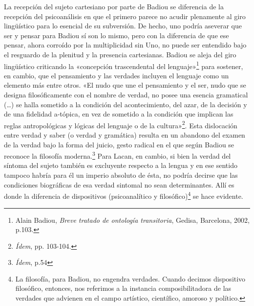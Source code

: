 La recepción del sujeto cartesiano por parte de Badiou se diferencia de la recepción del psicoanálisis en que el primero parece no acudir plenamente al giro lingüístico para lo esencial de su subversión. De hecho, uno podría aseverar que ser y pensar para Badiou sí son lo mismo, pero con la diferencia de que ese pensar, ahora corroído por la multiplicidad sin Uno, no puede ser entendido bajo el resguardo de la plenitud y la presencia cartesianas. Badiou se aleja del giro lingüístico criticando la «concepción trascendental del lenguaje»\footnote{Alain Badiou, \emph{Breve tratado de ontología transitoria}, Gedisa, Barcelona, 2002, p.103.} para sostener, en cambio, que el pensamiento y las verdades incluyen el lenguaje como un elemento más entre otros. «El nudo que une el pensamiento y el ser, nudo que se designa filosóficamente con el nombre de verdad, no posee una esencia gramatical (\ldots) se halla sometido a la condición del acontecimiento, del azar, de la decisión y de una fidelidad a-tópica, en vez de sometido a la condición que implican las reglas antropológicas y lógicas del lenguaje o de la cultura»\footnote{\emph{Ídem}, pp. 103-104.}. Esta dislocación entre verdad y saber (o verdad y gramática) resulta en un abandono del examen de la verdad bajo la forma del juicio, gesto radical en el que según Badiou se reconoce la filosofía moderna.\footnote{\emph{Ídem}, p.54} Para Lacan, en cambio, si bien la verdad del síntoma del sujeto también es excluyente respecto a la lengua y en ese sentido tampoco habría para él un imperio absoluto de ésta, no podría decirse que las condiciones biográficas de esa verdad sintomal no sean determinantes. Allí es donde la diferencia de dispositivos (psicoanalítico y filosófico)\footnote{La filosofía, para Badiou, no engendra verdades. Cuando decimos dispositivo filosófico, entonces, nos referimos a la instancia composibilitadora de las verdades que advienen en el campo artístico, científico, amoroso y político.} se hace evidente.

